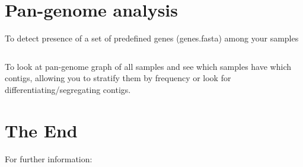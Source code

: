 \documentclass[a4paper,9pt]{extarticle}
\begin{document}
\begin{multicols*}{2}
\section{Pan-genome analysis}

To detect presence of a set of predefined genes (genes.fasta) among your samples
\begin{verbatim}
\end{verbatim}
To look at pan-genome graph of all samples and see which samples have which contigs, allowing you to stratify them by frequency or look for differentiating/segregating contigs.


\section{The End}

For further information:


\end{multicols*}
\end{document}
